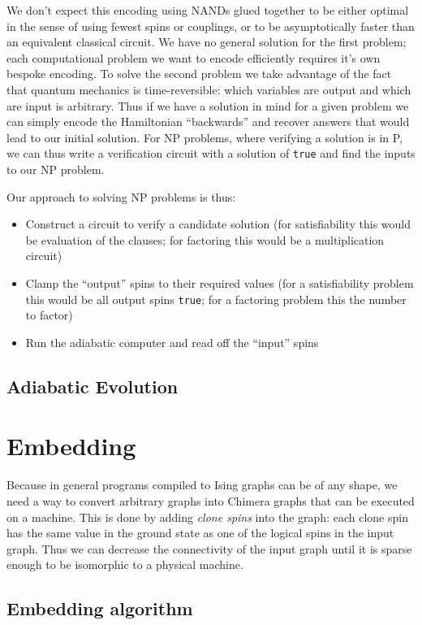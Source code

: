 \documentclass[12pt]{dalthesis}
\begin{document}
We don't expect this encoding using NANDs glued together to be either optimal in the sense of using fewest spins or couplings, or to be asymptotically faster than an equivalent classical circuit.  We have no general solution for the first problem; each computational problem we want to encode efficiently requires it's own bespoke encoding.  To solve the second problem we take advantage of the fact that quantum mechanics is time-reversible: which variables are output and which are input is arbitrary.  Thus if we have a solution in mind for a given problem we can simply encode the Hamiltonian ``backwards'' and recover answers that would lead to our initial solution.  For NP problems, where verifying a solution is in P, we can thus write a verification circuit with a solution of \texttt{true} and find the inputs to our NP problem.

Our approach to solving NP problems is thus:
\begin{itemize}
	\item Construct a circuit to verify a candidate solution (for satisfiability this would be evaluation of the clauses; for factoring this would be a multiplication circuit)
	\item Clamp the ``output'' spins to their required values (for a satisfiability problem this would be all output spins \texttt{true}; for a factoring problem this the number to factor)
	\item Run the adiabatic computer and read off the ``input'' spins
\end{itemize}

\section{Adiabatic Evolution}

\chapter{Embedding}
Because in general programs compiled to Ising graphs can be of any shape, we need a way to convert arbitrary graphs into Chimera graphs that can be executed on a machine.  This is done by adding \emph{clone spins} into the graph: each clone spin has the same value in the ground state as one of the logical spins in the input graph.  Thus we can decrease the connectivity of the input graph until it is sparse enough to be isomorphic to a physical machine.

\section{ Embedding algorithm}
\end{document}
